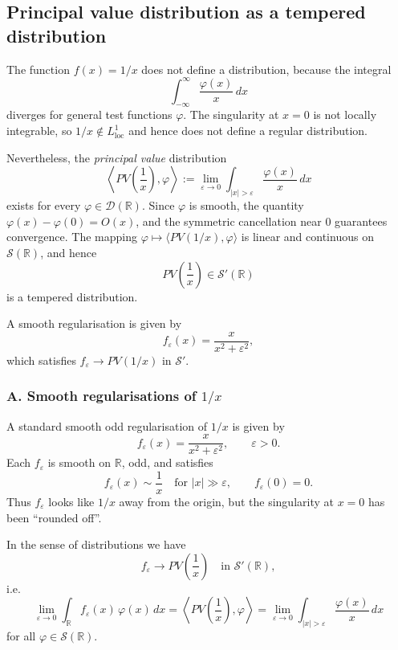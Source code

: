 \documentclass[12pt,a4paper]{article}
\theoremstyle{plain}
\theoremstyle{definition}
\theoremstyle{remark}
\theoremstyle{remark}
\begin{document}
\clearpage

\subsection*{Principal value distribution as a tempered distribution}

The function $f(x)=1/x$ does not define a distribution, because the
integral
\[
\int_{-\infty}^{\infty} \frac{\varphi(x)}{x}\,dx
\]
diverges for general test functions $\varphi$. The singularity at $x=0$
is not locally integrable, so $1/x\notin L^1_{\mathrm{loc}}$ and hence
does not define a regular distribution.

Nevertheless, the \emph{principal value} distribution
\[
\left\langle PV\!\left(\frac1x\right),\varphi\right\rangle
:=
\lim_{\varepsilon\to 0}
\int_{|x|>\varepsilon} \frac{\varphi(x)}{x}\,dx
\]
exists for every $\varphi\in\mathcal{D}(\mathbb{R})$. Since $\varphi$ is
smooth, the quantity $\varphi(x)-\varphi(0)=O(x)$, and the symmetric
cancellation near $0$ guarantees convergence. The mapping
$\varphi\mapsto \langle PV(1/x),\varphi\rangle$ is linear and continuous
on $\mathcal{S}(\mathbb{R})$, and hence
\[
PV\!\left(\frac1x\right)\in\mathcal{S}'(\mathbb{R})
\]
is a tempered distribution.

A smooth regularisation is given by
\[
f_\varepsilon(x)=\frac{x}{x^2+\varepsilon^2},
\]
which satisfies $f_\varepsilon\to PV(1/x)$ in $\mathcal{S}'$.

\subsubsection*{A. Smooth regularisations of $1/x$}

A standard smooth odd regularisation of $1/x$ is given by
\[
f_\varepsilon(x) = \frac{x}{x^2+\varepsilon^2},
\qquad \varepsilon>0.
\]
Each $f_\varepsilon$ is smooth on $\mathbb{R}$, odd, and satisfies
\[
f_\varepsilon(x) \sim \frac{1}{x} \quad\text{for } |x|\gg\varepsilon,
\qquad
f_\varepsilon(0)=0.
\]
Thus $f_\varepsilon$ looks like $1/x$ away from the origin, but the
singularity at $x=0$ has been ``rounded off''.

In the sense of distributions we have
\[
f_\varepsilon \longrightarrow PV\!\left(\frac1x\right)
\quad\text{in }\mathcal{S}'(\mathbb{R}),
\]
i.e.
\[
\lim_{\varepsilon\to 0}
\int_{\mathbb{R}} f_\varepsilon(x)\,\varphi(x)\,dx
=
\left\langle PV\!\left(\frac1x\right),\varphi\right\rangle
= \lim_{\varepsilon\to0}
\int_{|x|>\varepsilon}\frac{\varphi(x)}{x}\,dx
\]
for all $\varphi\in\mathcal{S}(\mathbb{R})$.
\end{document}
